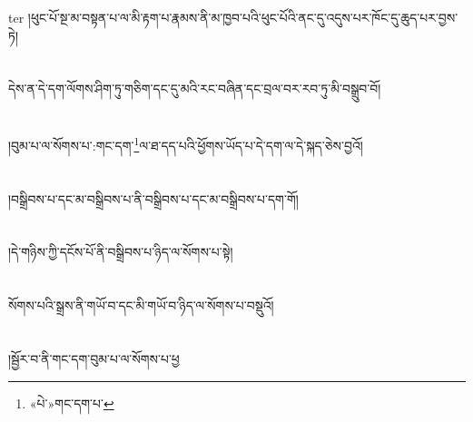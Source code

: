 ter{ }།ཕུང་པོ་སྔ་མ་བསྟན་པ་ལ་མི་རྟག་པ་རྣམས་ནི་མ་ཁྱབ་པའི་ཕུང་པོའི་ནང་དུ་འདུས་པར་ཁོང་དུ་ཆུད་པར་བྱས་ཏེ།\chapter{ }དེས་ན་དེ་དག་ལོགས་ཤིག་ཏུ་གཅིག་དང་དུ་མའི་རང་བཞིན་དང་བྲལ་བར་རབ་ཏུ་མི་བསྒྲུབ་བོ།\chapter{ }།བུམ་པ་ལ་སོགས་པ་:གང་དག་\footnote{«པེ་»གང་དག་པ་}ལ་ཐ་དད་པའི་ཕྱོགས་ཡོད་པ་དེ་དག་ལ་དེ་སྐད་ཅེས་བྱའོ།\chapter{ }།བསྒྲིབས་པ་དང་མ་བསྒྲིབས་པ་ནི་བསྒྲིབས་པ་དང་མ་བསྒྲིབས་པ་དག་གོ།\chapter{ }།དེ་གཉིས་ཀྱི་དངོས་པོ་ནི་བསྒྲིབས་པ་ཉིད་ལ་སོགས་པ་སྟེ།\chapter{ }སོགས་པའི་སྒྲས་ནི་གཡོ་བ་དང་མི་གཡོ་བ་ཉིད་ལ་སོགས་པ་བསྡུའོ།\chapter{ }།སྦྱོར་བ་ནི་གང་དག་བུམ་པ་ལ་སོགས་པ་ཕྱ